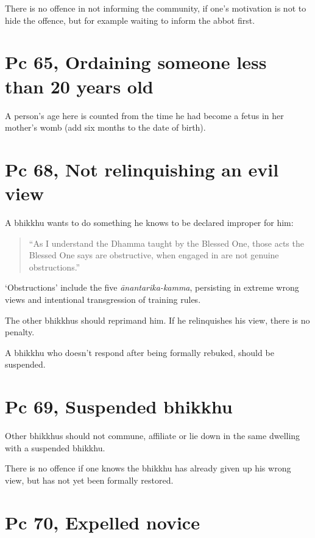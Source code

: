 There is no offence in not informing the community, if one's motivation
is not to hide the offence, but for example waiting to inform the abbot
first.

\section{Pc 65, Ordaining someone less than 20 years old}

A person's age here is counted from the time he had become a fetus in
her mother's womb (add six months to the date of birth).

\section{Pc 68, Not relinquishing an evil view}

A bhikkhu wants to do something he knows to be declared improper for
him:

\begin{quote}
``As I understand the Dhamma taught by the Blessed One, those acts the
Blessed One says are obstructive, when engaged in are not genuine
obstructions.''
\end{quote}

`Obstructions' include the five \emph{ānantarika-kamma}, persisting in
extreme wrong views and intentional transgression of training rules.

\enlargethispage*{\baselineskip}

The other bhikkhus should reprimand him. If he relinquishes his view,
there is no penalty.

A bhikkhu who doesn't respond after being formally rebuked, should be
suspended.

\clearpage

\section{Pc 69, Suspended bhikkhu}

Other bhikkhus should not commune, affiliate or lie down in the same
dwelling with a suspended bhikkhu.

There is no offence if one knows the bhikkhu has already given up his
wrong view, but has not yet been formally restored.

\section{Pc 70, Expelled novice}

